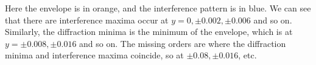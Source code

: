 \documentclass[10pt]{article}
\begin{document}
\begin{enumerate}[resume, label=\alph*)]
\begin{solution}
            Here the envelope is in orange, and the interference pattern is in blue. We can see that there are interference maxima occur at $y = 0, \pm 0.002, \pm 0.006$ and so on. Similarly, the diffraction minima is the minimum of the envelope, which is at $y = \pm 0.008, \pm 0.016$ and so on. The missing orders are where the diffraction minima and interference maxima coincide, so at $\pm 0.08, \pm 0.016$, etc.



        \end{solution}
    \end{enumerate}
\end{document}
